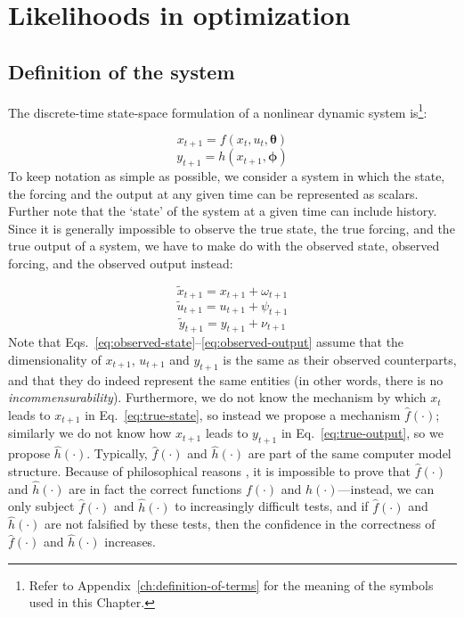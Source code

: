 
\chapter{Likelihoods in optimization}
\label{ch:likelihoods-in-optimization}


\section{Definition of the system}


The discrete-time state-space formulation of a nonlinear dynamic system is\footnote{Refer to Appendix~\ref{ch:definition-of-terms} for the meaning of the symbols used in this Chapter.}:

\begin{equation}\label{eq:true-state}
x_{t+1}=f(x_t,u_t,\boldsymbol\theta)
\end{equation}
\begin{equation}\label{eq:true-output}
y_{t+1}=h(x_{t+1},\boldsymbol\phi)
\end{equation}
To keep notation as simple as possible, we consider a system in which the state, the forcing and the output at any given time can be represented as scalars. Further note that the `state' of the system at a given time can include history.
Since it is generally impossible to observe the true state, the true forcing, and the true output of a system, we have to make do with the observed state, observed forcing, and the observed output instead:

\begin{equation}\label{eq:observed-state}
\tilde{x}_{t+1}=x_{t+1} + \omega_{t+1}
\end{equation}
\begin{equation}\label{eq:observed-forcing}
\tilde{u}_{t+1}=u_{t+1} + \psi_{t+1}
\end{equation}
\begin{equation}\label{eq:observed-output}
\tilde{y}_{t+1}=y_{t+1} + \nu_{t+1}
\end{equation}
Note that Eqs.~\ref{eq:observed-state}--\ref{eq:observed-output} assume that the dimensionality of $x_{t+1}$, $u_{t+1}$ and $y_{t+1}$ is the same as their observed counterparts, and that they do indeed represent the same entities (in other words, there is no \textit{incommensurability}). Furthermore, we do not know the mechanism by which $x_t$ leads to $x_{t+1}$ in Eq.~\ref{eq:true-state}, so instead we propose a mechanism $\hat{f}(\cdot{})$; similarly we do not know how $x_{t+1}$ leads to $y_{t+1}$ in Eq.~\ref{eq:true-output}, so we propose $\hat{h}(\cdot{})$. Typically, $\hat{f}(\cdot{})$ and $\hat{h}(\cdot{})$ are part of the same computer model structure. Because of philosophical reasons \citep[e.g.][]{popp-2009}, it is impossible to prove that $\hat{f}(\cdot{})$ and $\hat{h}(\cdot{})$ are in fact the correct functions $f(\cdot{})$ and $h(\cdot{})$---instead, we can only subject $\hat{f}(\cdot{})$ and $\hat{h}(\cdot{})$ to increasingly difficult tests, and if $\hat{f}(\cdot{})$ and $\hat{h}(\cdot{})$ are not falsified by these tests, then the confidence in the correctness of $\hat{f}(\cdot{})$ and $\hat{h}(\cdot{})$ increases.



